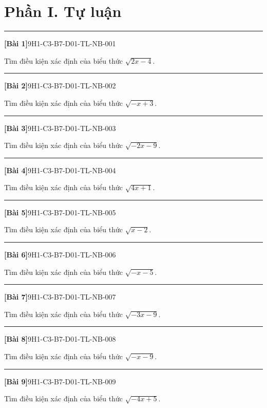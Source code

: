 \documentclass[12pt,a4paper]{article}
\newif\ifloigiai
\newenvironment{cauhoi}[2]{%
  \par\medskip\noindent\rule{\textwidth}{0.4pt}\par\nopagebreak
  \noindent\textbf{[#1]}\hfill{\scriptsize\ttfamily #2}\par\nopagebreak\smallskip}{\par}
\newcommand{\loigiai}[1]{\ifloigiai\par\smallskip\noindent\textit{Lời giải.} #1\par\fi}
\begin{document}
\section*{Phần I. Tự luận}
\begin{cauhoi}{Bài 1}{9H1-C3-B7-D01-TL-NB-001}
Tìm điều kiện xác định của biểu thức $\sqrt{2x - 4}$.
\loigiai{Biểu thức xác định khi $2x - 4\ge 0$, tức là $x\ge 2$.}
\end{cauhoi}
\begin{cauhoi}{Bài 2}{9H1-C3-B7-D01-TL-NB-002}
Tìm điều kiện xác định của biểu thức $\sqrt{-x + 3}$.
\loigiai{Biểu thức xác định khi $-x + 3\ge 0$, tức là $x\le 3$, suy ra $x\le 3$.}
\end{cauhoi}
\begin{cauhoi}{Bài 3}{9H1-C3-B7-D01-TL-NB-003}
Tìm điều kiện xác định của biểu thức $\sqrt{-2x - 9}$.
\loigiai{Biểu thức xác định khi $-2x - 9\ge 0$, tức là $2x\le -9$, suy ra $x\le -\dfrac{9}{2}$.}
\end{cauhoi}
\begin{cauhoi}{Bài 4}{9H1-C3-B7-D01-TL-NB-004}
Tìm điều kiện xác định của biểu thức $\sqrt{4x + 1}$.
\loigiai{Biểu thức xác định khi $4x + 1\ge 0$, tức là $x\ge -\dfrac{1}{4}$.}
\end{cauhoi}
\begin{cauhoi}{Bài 5}{9H1-C3-B7-D01-TL-NB-005}
Tìm điều kiện xác định của biểu thức $\sqrt{x - 2}$.
\loigiai{Biểu thức xác định khi $x - 2\ge 0$, tức là $x\ge 2$.}
\end{cauhoi}
\begin{cauhoi}{Bài 6}{9H1-C3-B7-D01-TL-NB-006}
Tìm điều kiện xác định của biểu thức $\sqrt{-x - 5}$.
\loigiai{Biểu thức xác định khi $-x - 5\ge 0$, tức là $x\le -5$, suy ra $x\le -5$.}
\end{cauhoi}
\begin{cauhoi}{Bài 7}{9H1-C3-B7-D01-TL-NB-007}
Tìm điều kiện xác định của biểu thức $\sqrt{-3x - 9}$.
\loigiai{Biểu thức xác định khi $-3x - 9\ge 0$, tức là $3x\le -9$, suy ra $x\le -3$.}
\end{cauhoi}
\begin{cauhoi}{Bài 8}{9H1-C3-B7-D01-TL-NB-008}
Tìm điều kiện xác định của biểu thức $\sqrt{-x - 9}$.
\loigiai{Biểu thức xác định khi $-x - 9\ge 0$, tức là $x\le -9$, suy ra $x\le -9$.}
\end{cauhoi}
\begin{cauhoi}{Bài 9}{9H1-C3-B7-D01-TL-NB-009}
Tìm điều kiện xác định của biểu thức $\sqrt{-4x + 5}$.
\loigiai{Biểu thức xác định khi $-4x + 5\ge 0$, tức là $4x\le 5$, suy ra $x\le \dfrac{5}{4}$.}
\end{cauhoi}
\end{document}
